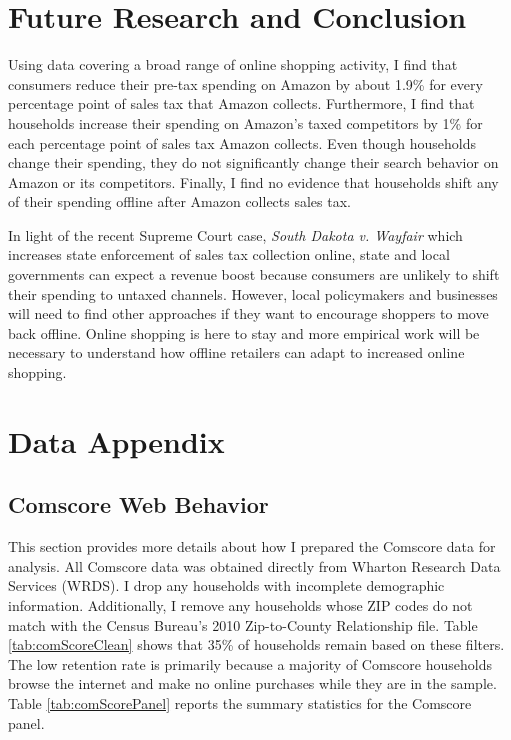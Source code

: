 \documentclass[AEJ,reviewmode]{AEA}
\begin{document}
\section{Future Research and Conclusion}
\label{sec:conclusion}
Using data covering a broad range of online shopping activity, I find that consumers reduce their pre-tax spending on Amazon by about 1.9\% for every percentage point of sales tax that Amazon collects. Furthermore, I find that households increase their spending on Amazon's taxed competitors by 1\% for each percentage point of sales tax Amazon collects. Even though households change their spending, they do not significantly change their search behavior on Amazon or its competitors. Finally, I find no evidence that households shift any of their spending offline after Amazon collects sales tax.

In light of the recent Supreme Court case, \textit{South Dakota v. Wayfair} which increases state enforcement of sales tax collection online, state and local governments can expect a revenue boost because consumers are unlikely to shift their spending to untaxed channels. However, local policymakers and businesses will need to find other approaches if they want to encourage shoppers to move back offline. Online shopping is here to stay and more empirical work will be necessary to understand how offline retailers can adapt to increased online shopping.




\appendix

\section{Data Appendix}
\label{sec:sampleConstruction}

\subsection{Comscore Web Behavior}
This section provides more details about how I prepared the Comscore data for analysis. All Comscore data was obtained directly from Wharton Research Data Services (WRDS). I drop any households with incomplete demographic information. Additionally, I remove any households whose ZIP codes do not match with the Census Bureau's 2010 Zip-to-County Relationship file. Table \ref{tab:comScoreClean} shows that 35\% of households remain based on these filters. The low retention rate is primarily because a majority of Comscore households browse the internet and make no online purchases while they are in the sample. Table \ref{tab:comScorePanel} reports the summary statistics for the Comscore panel.
\end{document}

